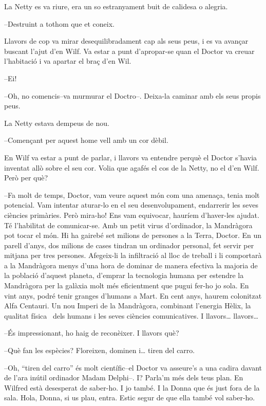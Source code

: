 La Netty es va riure, era un so estranyament buit de calidesa o alegria.

--Destruint a tothom que et coneix.

Llavors de cop va mirar desequilibradament cap als seus peus, i es va
avançar buscant l'ajut d'en Wilf. Va estar a punt d'apropar-se quan el
Doctor va creuar l'habitació i va apartar el braç d'en Wil.

--Ei!

--Oh, no comencis--va murmurar el Doctro--. Deixa-la caminar amb els
seus propis peus.

La Netty estava dempeus de nou.

--Començant per aquest home vell amb un cor dèbil.

En Wilf va estar a punt de parlar, i llavors va entendre perquè el
Doctor s'havia inventat allò sobre el seu cor. Volia que agafés el cos
de la Netty, no el d'en Wilf. Però per què?

--Fa molt de temps, Doctor, vam veure aquest món com una amenaça, tenia
molt potencial. Vam intentar aturar-lo en el seu desenvolupament,
endarrerir les seves ciències primàries. Però mira-ho! Ens vam
equivocar, hauríem d'haver-les ajudat. Té l'habilitat de comunicar-se.
Amb un petit virus d'ordinador, la Mandràgora pot tocar el món. Hi ha
gairebé set milions de persones a la Terra, Doctor. En un parell d'anys,
dos milions de cases tindran un ordinador personal, fet servir per
mitjana per tres persones. Afegeix-li la infiltració al lloc de treball
i li comportarà a la Mandràgora menys d'una hora de dominar de manera
efectiva la majoria de la població d'aquest planeta, d'emprar la
tecnologia humana per estendre la Mandràgora per la galàxia molt més
eficientment que pugui fer-ho jo sola. En vint anys, podré tenir granges
d'humans a Mart. En cent anys, haurem colonitzat Alfa Centauri. Un nou
Imperi de la Mandràgora, combinant l'energia Hèlix, la qualitat física
~dels humans i les seves ciències comunicatives. I llavors\ldots{}
llavors\ldots{}

--És impressionant, ho haig de reconèixer. I llavors què?

--Què fan les espècies? Floreixen, dominen i\ldots{} tiren del carro.

--Oh, ``tiren del carro'' és molt científic--el Doctor va asseure's a
una cadira davant de l'ara inútil ordinador Madam Delphi--. I? Parla'm
més dels teus plan. En Wilfred està desesperat de saber-ho. I jo també.
I la Donna que és just fora de la sala. Hola, Donna, si us plau, entra.
Estic segur de que ella també vol saber-ho.

